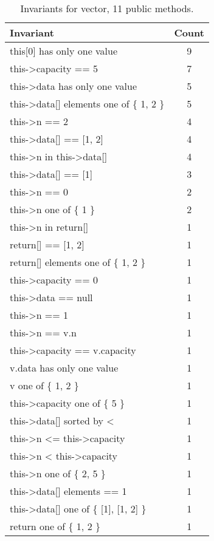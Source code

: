 \begin{table}[ht]
\centering
\scriptsize
\caption{Invariants for vector, 11 public methods. }
\label{vector_daikon}
\begin{tabular}{|l|c|}
\hline
Invariant & Count \\
\hline
this[0] has only one value & 9 \\
this->capacity == 5 & 7 \\
this->data has only one value & 5 \\
this->data[] elements one of \{ 1, 2 \} & 5 \\
this->n == 2 & 4 \\
this->data[] == [1, 2] & 4 \\
this->n in this->data[] & 4 \\
this->data[] == [1] & 3 \\
this->n == 0 & 2 \\
this->n one of \{ 1 \} & 2 \\
this->n in return[] & 1 \\
return[] == [1, 2] & 1 \\
return[] elements one of \{ 1, 2 \} & 1 \\
this->capacity == 0 & 1 \\
this->data == null & 1 \\
this->n == 1 & 1 \\
this->n == v.n & 1 \\
this->capacity == v.capacity & 1 \\
v.data has only one value & 1 \\
v one of \{ 1, 2 \} & 1 \\
this->capacity one of \{ 5 \} & 1 \\
this->data[] sorted by < & 1 \\
this->n <= this->capacity & 1 \\
this->n < this->capacity & 1 \\
this->n one of \{ 2, 5 \} & 1 \\
this->data[] elements == 1 & 1 \\
this->data[] one of \{ [1], [1, 2] \} & 1 \\
return one of \{ 1, 2 \} & 1 \\
\hline
\end{tabular}
\end{table}

